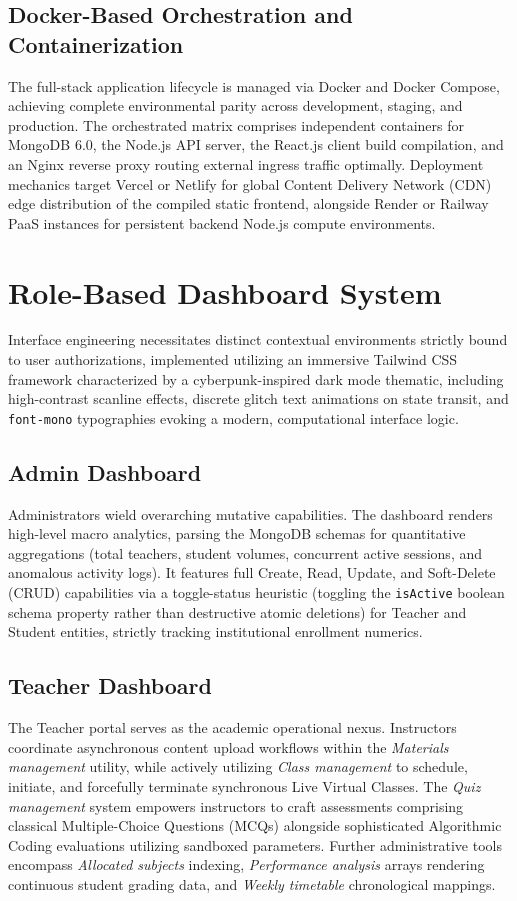 \documentclass[12pt, journal, onecolumn]{IEEEtran}
\begin{document}
\subsection{Docker-Based Orchestration and Containerization}
The full-stack application lifecycle is managed via Docker and Docker Compose, achieving complete environmental parity across development, staging, and production. The orchestrated matrix comprises independent containers for MongoDB 6.0, the Node.js API server, the React.js client build compilation, and an Nginx reverse proxy routing external ingress traffic optimally. Deployment mechanics target Vercel or Netlify for global Content Delivery Network (CDN) edge distribution of the compiled static frontend, alongside Render or Railway PaaS instances for persistent backend Node.js compute environments.

\section{Role-Based Dashboard System}
Interface engineering necessitates distinct contextual environments strictly bound to user authorizations, implemented utilizing an immersive Tailwind CSS framework characterized by a cyberpunk-inspired dark mode thematic, including high-contrast scanline effects, discrete glitch text animations on state transit, and \texttt{font-mono} typographies evoking a modern, computational interface logic.

\subsection{Admin Dashboard}
Administrators wield overarching mutative capabilities. The dashboard renders high-level macro analytics, parsing the MongoDB schemas for quantitative aggregations (total teachers, student volumes, concurrent active sessions, and anomalous activity logs). It features full Create, Read, Update, and Soft-Delete (CRUD) capabilities via a toggle-status heuristic (toggling the \texttt{isActive} boolean schema property rather than destructive atomic deletions) for Teacher and Student entities, strictly tracking institutional enrollment numerics.

\subsection{Teacher Dashboard}
The Teacher portal serves as the academic operational nexus. Instructors coordinate asynchronous content upload workflows within the \textit{Materials management} utility, while actively utilizing \textit{Class management} to schedule, initiate, and forcefully terminate synchronous Live Virtual Classes. The \textit{Quiz management} system empowers instructors to craft assessments comprising classical Multiple-Choice Questions (MCQs) alongside sophisticated Algorithmic Coding evaluations utilizing sandboxed parameters. Further administrative tools encompass \textit{Allocated subjects} indexing, \textit{Performance analysis} arrays rendering continuous student grading data, and \textit{Weekly timetable} chronological mappings.
\end{document}
